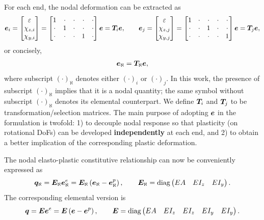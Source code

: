 For each end, the nodal deformation can be extracted as
\begin{gather}
\bm{e}_i=\begin{bmatrix}
\varepsilon\\\chi_{z,i}\\\chi_{y,i}
\end{bmatrix}=\begin{bmatrix}
1&\cdot&\cdot&\cdot&\cdot\\
\cdot&1&\cdot&\cdot&\cdot\\
\cdot&\cdot&\cdot&1&\cdot
\end{bmatrix}\bm{e}=\bm{T}_i\bm{e},\qquad
\bm{e}_j=\begin{bmatrix}
\varepsilon\\\chi_{z,j}\\\chi_{y,j}
\end{bmatrix}=\begin{bmatrix}
1&\cdot&\cdot&\cdot&\cdot\\
\cdot&\cdot&1&\cdot&\cdot\\
\cdot&\cdot&\cdot&\cdot&1
\end{bmatrix}\bm{e}=\bm{T}_j\bm{e},
\end{gather}
or concisely,
\begin{gather}
\bm{e}_\aleph=\bm{T}_\aleph\bm{e},
\end{gather}
where subscript $\left(\cdot\right)_\aleph$ denotes either $\left(\cdot\right)_i$ or $\left(\cdot\right)_j$.
In this work, the presence of subscript $\left(\cdot\right)_\aleph$ implies that it is a nodal quantity; the same symbol without subscript $\left(\cdot\right)_\aleph$ denotes its elemental counterpart.
We define $\bm{T}_i$ and $\bm{T}_j$ to be transformation/selection matrices.
The main purpose of adopting $\bm{e}$ in the formulation is twofold: 1) to decouple nodal response so that plasticity (on rotational DoFs) can be developed \textbf{independently} at each end, and 2) to obtain a better implication of the corresponding plastic deformation.

The nodal elasto-plastic constitutive relationship can now be conveniently expressed as
\begin{gather}
\bm{q}_\aleph=\bm{E}_\aleph\bm{e}_\aleph^e=\bm{E}_\aleph\left(\bm{e}_\aleph-\bm{e}_\aleph^p\right),\qquad\bm{E}_\aleph=\text{diag}\left(\begin{matrix}
EA&EI_z&EI_y
\end{matrix}\right).
\end{gather}
The corresponding elemental version is
\begin{gather}
\bm{q}=\bm{E}\bm{e}^e=\bm{E}\left(\bm{e}-\bm{e}^p\right),\qquad\bm{E}=\text{diag}\left(\begin{matrix}
EA&EI_z&EI_z&EI_y&EI_y
\end{matrix}\right).
\end{gather}

